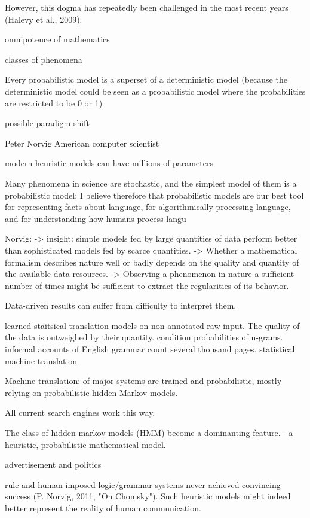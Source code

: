 \documentclass[authoryear,review,3p]{elsarticle}
\begin{document}
However, this dogma has repeatedly been challenged in the most recent years
(Halevy et al., 2009).

omnipotence of mathematics



classes of phenomena

Every probabilistic model is a superset of a deterministic model (because the deterministic model could be seen as a probabilistic model where the probabilities are restricted to be 0 or 1)

possible paradigm shift

Peter Norvig 
American computer scientist

modern heuristic models can have millions of parameters

Many phenomena in science are stochastic, and the simplest model of them is a probabilistic model; I believe therefore that probabilistic models are our best tool for representing facts about language, for algorithmically processing language, and for understanding how humans process langu


Norvig:
-> insight: simple models fed by large quantities of data perform
better than sophisticated models fed by scarce quantities.
-> Whether a mathematical formalism describes nature well or badly
depends on the quality and quantity of the available data resources.
-> Observing a phenomenon in nature a sufficient number of times
might be sufficient to extract the regularities of its behavior.

Data-driven results can suffer from difficulty to interpret them.

learned staitsical translation models on non-annotated raw
input.
The quality of the data is outweighed by their quantity.
condition probabilities of n-grams.
informal accounts of English grammar count several thousand pages.
statistical machine translation

Machine translation:  of major systems are trained and probabilistic, mostly relying on
probabilistic hidden Markov models.

All current search engines work this way.

The class of hidden markov models (HMM) become a dominanting feature.
- a heuristic, probabilistic mathematical model.

advertisement and politics

rule and human-imposed logic/grammar systems never achieved
convincing success (P. Norvig, 2011, "On Chomsky").
Such heuristic models might indeed better represent the reality of
human communication.
\end{document}

